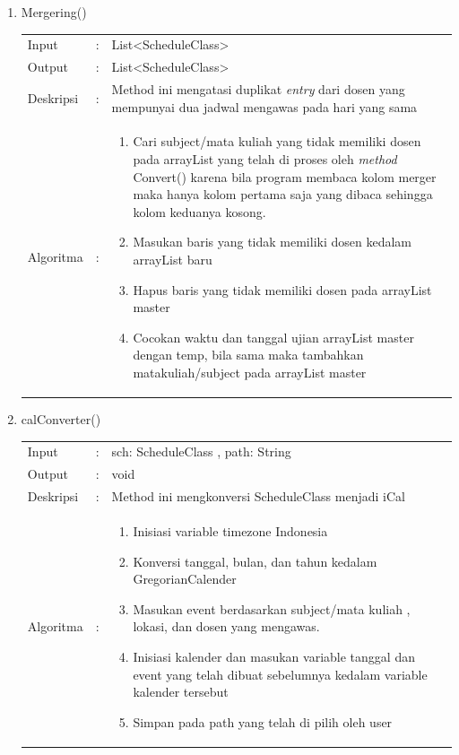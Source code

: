 \begin{enumerate}
	\item Mergering()\\
	\begin{tabular}{l c p{9cm}}
		Input & : & List<ScheduleClass> \\ 
		Output & : & List<ScheduleClass> \\ 
		Deskripsi & : & Method ini mengatasi duplikat \textit{entry} dari dosen yang mempunyai dua jadwal mengawas pada hari yang sama\\
		Algoritma & : & 
			\begin{enumerate}
				\item Cari subject/mata kuliah yang tidak memiliki dosen pada arrayList yang telah di proses oleh \textit{method} Convert() karena bila program membaca kolom merger maka hanya kolom pertama saja yang dibaca sehingga kolom keduanya kosong.
				\item Masukan baris yang tidak memiliki dosen kedalam arrayList baru
				\item Hapus baris yang tidak memiliki dosen pada arrayList master
				\item Cocokan waktu dan tanggal ujian arrayList master dengan temp, bila sama maka tambahkan matakuliah/subject pada arrayList master
			\end{enumerate}
		\end{tabular}	
	
	\item calConverter()\\
	\begin{tabular}{l c p{9cm}}
		Input & : & sch: ScheduleClass , path: String\\ 
		Output & : & void \\ 
		Deskripsi & : & Method ini mengkonversi ScheduleClass menjadi iCal\\
		Algoritma & : & 
			\begin{enumerate}
				\item Inisiasi variable timezone Indonesia
				\item Konversi tanggal, bulan, dan tahun kedalam GregorianCalender
				\item Masukan event berdasarkan subject/mata kuliah , lokasi, dan dosen yang mengawas.
				\item Inisiasi kalender dan masukan variable tanggal dan event yang telah dibuat sebelumnya kedalam variable kalender tersebut
				\item Simpan pada path yang telah di pilih oleh user
			\end{enumerate}
		\end{tabular}	
		

\end{enumerate}
